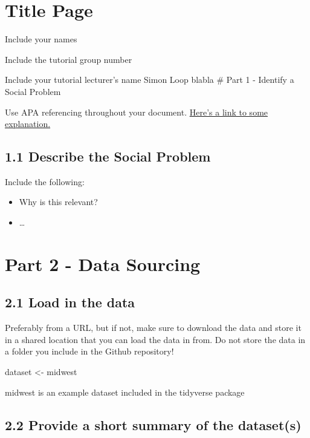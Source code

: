 \documentclass[
]{article}
\newenvironment{Shaded}{\begin{snugshade}}{\end{snugshade}}
\newcommand{\NormalTok}[1]{#1}
\newcommand{\OtherTok}[1]{\textcolor[rgb]{0.56,0.35,0.01}{#1}}
\begin{document}
\section{Title Page}\label{title-page}

Include your names

Include the tutorial group number

Include your tutorial lecturer's name Simon Loop blabla \# Part 1 -
Identify a Social Problem

Use APA referencing throughout your document.
\href{https://www.mendeley.com/guides/apa-citation-guide/}{Here's a link
to some explanation.}

\subsection{1.1 Describe the Social
Problem}\label{describe-the-social-problem}

Include the following:

\begin{itemize}
\item
  Why is this relevant?
\item
  \ldots{}
\end{itemize}

\section{Part 2 - Data Sourcing}\label{part-2---data-sourcing}

\subsection{2.1 Load in the data}\label{load-in-the-data}

Preferably from a URL, but if not, make sure to download the data and
store it in a shared location that you can load the data in from. Do not
store the data in a folder you include in the Github repository!

\begin{Shaded}
\begin{Highlighting}[]
\NormalTok{dataset }\OtherTok{\textless{}{-}}\NormalTok{ midwest}
\end{Highlighting}
\end{Shaded}

midwest is an example dataset included in the tidyverse package

\subsection{2.2 Provide a short summary of the
dataset(s)}\label{provide-a-short-summary-of-the-datasets}
\end{document}
